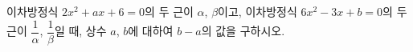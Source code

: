 이차방정식 $2x^2+ax+6=0$의 두 근이 $\alpha$, $\beta$이고, 이차방정식 $6x^2-3x+b=0$의 두 근이 $\dfrac{1}{\alpha}$, $\dfrac{1}{\beta}$일 때, 상수 $a$, $b$에 대하여 $b-a$의 값을 구하시오.
